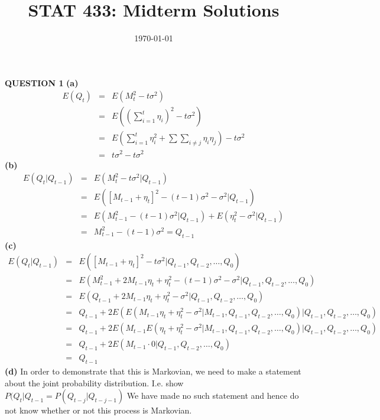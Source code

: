 \documentclass{amsart}
\theoremstyle{definition}
\theoremstyle{remark}
\numberwithin{equation}{section}
\begin{document}
\title{STAT 433: Midterm Solutions}

\date{ \today}





\maketitle
\flushleft
{\bf QUESTION 1}
\newline
{\bf (a)}
\begin{eqnarray}
\nonumber E(Q_t)&=&E\left(M_t^2-t\sigma^2\right) \\
\nonumber &=&E\left(\left(\sum_{i=1}^{t} \eta_i\right)^2-t\sigma^2\right) \\
\nonumber &=&E\left(\sum_{i=1}^{t} \eta_i^2 + \sum \sum_{i \neq j} \eta_i \eta_j \right) - t\sigma^2 \\
\nonumber &=&t\sigma^2-t\sigma^2
\end{eqnarray}
\newline
{\bf (b)}
\begin{eqnarray}
\nonumber E(Q_t | Q_{t-1})&=&E(M_t^2-t\sigma^2 | Q_{t-1}) \\
\nonumber &=& E\left(\left[M_{t-1}+\eta_t\right]^2-(t-1)\sigma^2-\sigma^2 | Q_{t-1} \right)\\
\nonumber &=& E\left(M_{t-1}^2-(t-1)\sigma^2 | Q_{t-1}\right)+E\left(\eta_t^2-\sigma^2 | Q_{t-1}\right) \\
\nonumber &=& M_{t-1}^2-(t-1)\sigma^2=Q_{t-1}
\end{eqnarray}
\newline
{\bf (c)}
\begin{eqnarray}
\nonumber E(Q_t | Q_{t-1}) &=& E\left(\left[M_{t-1}+\eta_t\right]^2-t\sigma^2 | Q_{t-1},Q_{t-2},\ldots,Q_0 \right)\\
\nonumber &=& E\left(M_{t-1}^2+2M_{t-1}\eta_t+\eta_t^2 - (t-1)\sigma^2 - \sigma^2 | Q_{t-1},Q_{t-2},\ldots,Q_0 \right) \\
\nonumber &=& E\left(Q_{t-1}+2M_{t-1}\eta_t+\eta_t^2 - \sigma^2 | Q_{t-1},Q_{t-2},\ldots,Q_0 \right) \\
\nonumber &=& Q_{t-1}+2E\left(E\left(M_{t-1}\eta_t+\eta_t^2 - \sigma^2|M_{t-1},Q_{t-1},Q_{t-2},\ldots,Q_0\right) | Q_{t-1},Q_{t-2},\ldots,Q_0\right) \\
\nonumber &=& Q_{t-1}+2E\left(M_{t-1}E\left(\eta_t+\eta_t^2 - \sigma^2|M_{t-1},Q_{t-1},Q_{t-2},\ldots,Q_0\right) | Q_{t-1},Q_{t-2},\ldots,Q_0\right) \\
\nonumber &=& Q_{t-1}+2E\left(M_{t-1}\cdot 0 | Q_{t-1},Q_{t-2},\ldots,Q_0\right) \\
\nonumber &=& Q_{t-1}
\end{eqnarray}
\newline
{\bf (d)}
In order to demonstrate that this is Markovian, we need to make a statement about the joint probability distribution. I.e. show $P(Q_t|Q_{t-1}=P(Q_{t-j}|Q_{t-j-1})$ We have made no such statement and hence do not know whether or not this process is Markovian.
\end{document}
